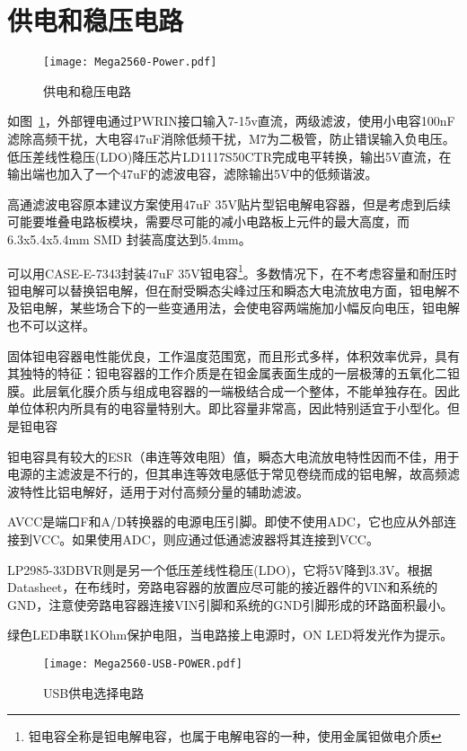 \section{供电和稳压电路}

\begin{figure}[htbp]
    \centering
    \texttt{[image: Mega2560-Power.pdf]}
    \caption{供电和稳压电路}
    \label{fig:Mega2560-Power}
\end{figure}

如图~\ref{fig:Mega2560-Power}，外部锂电通过PWRIN接口输入7-15v直流，两级滤波，使用小电容100nF滤除高频干扰，大电容47uF消除低频干扰，M7为二极管，防止错误输入负电压。低压差线性稳压(LDO)降压芯片LD1117S50CTR完成电平转换，输出5V直流，在输出端也加入了一个47uF的滤波电容，滤除输出5V中的低频谐波。

高通滤波电容原本建议方案使用47uF 35V贴片型铝电解电容器，但是考虑到后续可能要堆叠电路板模块，需要尽可能的减小电路板上元件的最大高度，而6.3x5.4x5.4mm SMD 封装高度达到5.4mm。

可以用CASE-E-7343封装47uF 35V钽电容\footnote{钽电容全称是钽电解电容，也属于电解电容的一种，使用金属钽做电介质}。多数情况下，在不考虑容量和耐压时钽电解可以替换铝电解，但在耐受瞬态尖峰过压和瞬态大电流放电方面，钽电解不及铝电解，某些场合下的一些变通用法，会使电容两端施加小幅反向电压，钽电解也不可以这样。

固体钽电容器电性能优良，工作温度范围宽，而且形式多样，体积效率优异，具有其独特的特征：钽电容器的工作介质是在钽金属表面生成的一层极薄的五氧化二钽膜。此层氧化膜介质与组成电容器的一端极结合成一个整体，不能单独存在。因此单位体积内所具有的电容量特别大。即比容量非常高，因此特别适宜于小型化。但是钽电容

钽电容具有较大的ESR（串连等效电阻）值，瞬态大电流放电特性因而不佳，用于电源的主滤波是不行的，但其串连等效电感低于常见卷绕而成的铝电解，故高频滤波特性比铝电解好，适用于对付高频分量的辅助滤波。

AVCC是端口F和A/D转换器的电源电压引脚。即使不使用ADC，它也应从外部连接到VCC。如果使用ADC，则应通过低通滤波器将其连接到VCC。

LP2985-33DBVR则是另一个低压差线性稳压(LDO)，它将5V降到3.3V。根据Datasheet，在布线时，旁路电容器的放置应尽可能的接近器件的VIN和系统的GND，注意使旁路电容器连接VIN引脚和系统的GND引脚形成的环路面积最小。

绿色LED串联1KOhm保护电阻，当电路接上电源时，ON LED将发光作为提示。

\begin{figure}[htbp]
    \centering
    \texttt{[image: Mega2560-USB-POWER.pdf]}
    \caption{USB供电选择电路}
    \label{fig:Mega2560-USB-POWER}
\end{figure}

